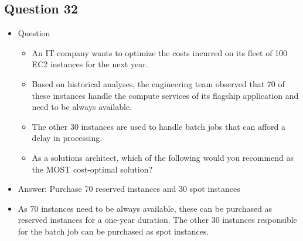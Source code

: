 \documentclass[]{scrartcl}
\begin{document}
\subsection{Question 32}
\begin{itemize}
	\item Question
	\begin{itemize}
		\item An IT company wants to optimize the costs incurred on its fleet of 100 EC2 instances for the next year. 
		\item Based on historical analyses, the engineering team observed that 70 of these instances handle the compute services of its flagship application and need to be always available. 
		\item The other 30 instances are used to handle batch jobs that can afford a delay in processing.
		\item As a solutions architect, which of the following would you recommend as the MOST cost-optimal solution?
	\end{itemize}
	\item Answer: Purchase 70 reserved instances and 30 spot instances
	\item As 70 instances need to be always available, these can be purchased as reserved instances for a one-year duration. The other 30 instances responsible for the batch job can be purchased as spot instances. 
\end{itemize}
\end{document}
